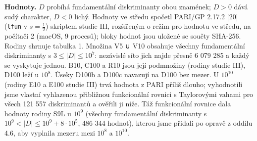 \documentclass[
  10pt,
]{article}
\begin{document}
\textbf{Hodnoty.} \(D\) probíhá fundamentální diskriminanty obou
znamének; \(D > 0\) dává sudý charakter, \(D < 0\) lichý. Hodnoty ve
středu spočetl PARI/GP 2.17.2 {[}20{]} (\texttt{lfun} v
\(s = \tfrac12\)) skriptem studie III, rozšířeným o režim pro hodnotu ve
středu, na počítači 2 (macOS, 9 procesů); bloky hodnot jsou uložené se
součty SHA-256. Rodiny shrnuje tabulka 1. Množina V5 ∪ V10 obsahuje
všechny fundamentální diskriminanty s \(3 \le |D| \le 10^7\): nezávislé
síto jich najde přesně 6 079 285 a každý se vyskytuje jednou. B10, C100
a R10 jsou její podmnožiny (rodiny studie III), D100 leží u \(10^8\).
Úseky D100b a D100c navazují na D100 bez mezer. U \(10^{10}\) (rodiny
E10 a E100 studie III) trvá hodnota z PARI příliš dlouho; vyhodnotili
jsme vlastní vyhlazenou přibližnou funkcionální rovnici s Taylorovými
vahami pro všech 121 557 diskriminantů a ověřili ji níže. Táž
funkcionální rovnice dala hodnoty rodiny S9L u \(10^9\) (všechny
fundamentální diskriminanty s \(10^9 < |D| \le 10^9 + 8\cdot10^5\), 486
344 hodnot), kterou jsme přidali po opravě z oddílu 4.6, aby vyplnila
mezeru mezi \(10^8\) a \(10^{10}\).
\end{document}
